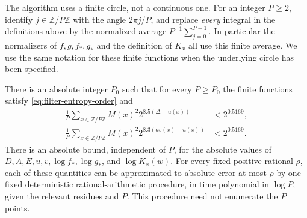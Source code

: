 The algorithm uses a finite circle, not a continuous one.  For an integer
$P\ge2$, identify $j\in\mathbb Z/P\mathbb Z$ with the angle $2\pi j/P$,
and replace \emph{every} integral in the definitions above by the
normalized average $P^{-1}\sum_{j=0}^{P-1}$.  In particular the
normalizers of $f,g,f_*,g_*$ and the definition of $K_x$ all use this
finite average.  We use the same notation for these finite functions
when the underlying circle has been specified.

\begin{lemma}\label{lemma:finite-filtering}\label{filtering-finite}
There is an absolute integer $P_0$ such that for every $P\ge P_0$ the
finite functions satisfy \eqref{eq:filter-entropy-order} and
\begin{equation}\label{eq:finite-filtering-moments}
\begin{split}
 \frac1P\sum_{x\in\mathbb Z/P\mathbb Z}
       M(x)^2 2^{8.5(\Delta-u(x))}&<2^{0.5169},\\
 \frac1P\sum_{x\in\mathbb Z/P\mathbb Z}
       M(x)^2 2^{8.3(a v(x)-u(x))}&<2^{0.5169}.
\end{split}
\end{equation}
There is an absolute bound, independent of $P$, for the absolute values
of $D,A,E,u,v,\log f_*,\log g_*$, and $\log K_x(w)$.
For every fixed positive rational $\rho$, each of these quantities can
be approximated to absolute error at most $\rho$ by one fixed
deterministic rational-arithmetic procedure, in time polynomial in
$\log P$, given the relevant residues and $P$.  This procedure need not
enumerate the $P$ points.
\end{lemma}

